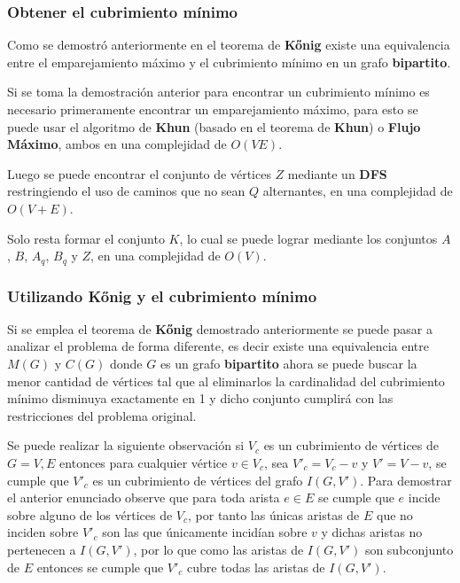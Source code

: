 \documentclass{article}
\begin{document}
\subsubsection{Obtener el cubrimiento mínimo}

Como se demostró anteriormente en el teorema de \textbf{Kőnig} existe una equivalencia entre el emparejamiento máximo y
el cubrimiento mínimo en un grafo \textbf{bipartito}.

Si se toma la demostración anterior para encontrar un cubrimiento mínimo es necesario primeramente encontrar un emparejamiento
máximo, para esto se puede usar el algoritmo de \textbf{Khun} (basado en el teorema de \textbf{Khun})
o \textbf{Flujo Máximo}, ambos en una complejidad de $O(VE)$.

Luego se puede encontrar el conjunto de vértices $Z$ mediante un \textbf{DFS} restringiendo el uso de caminos que no sean
$Q$ alternantes, en una complejidad de $O(V+E)$.

Solo resta formar el conjunto $K$, lo cual se puede lograr mediante los conjuntos $A$, $B$, $A_q$, $B_q$ y $Z$, en una complejidad
de $O(V)$.

\subsubsection{Utilizando \textbf{Kőnig} y el cubrimiento mínimo}

Si se emplea el teorema de \textbf{Kőnig} demostrado anteriormente se puede pasar a analizar el problema de forma diferente,
es decir existe una equivalencia entre $M(G)$ y $C(G)$ donde $G$ es un grafo \textbf{bipartito} ahora se puede buscar
la menor cantidad de vértices tal que al eliminarlos la cardinalidad del cubrimiento mínimo disminuya exactamente en 1 y dicho conjunto cumplirá
con las restricciones del problema original.

Se puede realizar la siguiente observación si $V_c$ es un cubrimiento de vértices de $G = V, E$ entonces para cualquier vértice $v \in V_c$, sea $V'_c=V_c - v$
y $V'= V-v$, se cumple que $V'_c$ es un cubrimiento de vértices del grafo $I(G,V')$. Para demostrar el anterior enunciado observe que para toda arista $e\in E$
se cumple que $e$ incide sobre alguno de los vértices de $V_c$, por tanto las únicas aristas de
$E$ que no inciden sobre $V'_c$ son las que únicamente incidían sobre $v$ y dichas aristas no pertenecen a $I(G,V')$,
por lo que como las aristas de $I(G,V')$ son subconjunto de $E$ entonces se cumple que $V'_c$ cubre todas las aristas
de $I(G,V')$.
\end{document}
